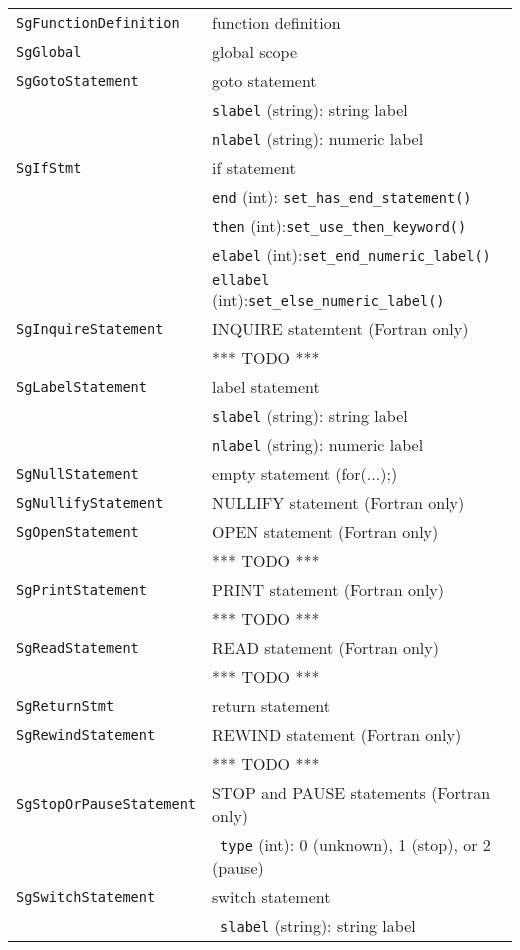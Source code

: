 \begin{longtable}[l]{l|p{10cm}}
 \texttt{SgFunctionDefinition}& function definition\\
 \texttt{SgGlobal}& global scope\\
 \texttt{SgGotoStatement}& goto statement\\
 & \texttt{slabel} (string): string label\\
 & \texttt{nlabel} (string): numeric label\\
 \texttt{SgIfStmt}& if statement\\
 & \texttt{end} (int): \texttt{set\_has\_end\_statement()}\\
 & \texttt{then} (int):\texttt{set\_use\_then\_keyword()}\\
 & \texttt{elabel} (int):\texttt{set\_end\_numeric\_label()}\\
 & \texttt{ellabel} (int):\texttt{set\_else\_numeric\_label()}\\
 \texttt{SgInquireStatement}& INQUIRE statemtent (Fortran only)\\
 & *** TODO *** \\
 \texttt{SgLabelStatement}& label statement\\
 & \texttt{slabel} (string): string label\\
 & \texttt{nlabel} (string): numeric label\\
 \texttt{SgNullStatement}& empty statement (for(...){;})\\
 \texttt{SgNullifyStatement}& NULLIFY statement (Fortran only)\\
 \texttt{SgOpenStatement}& OPEN statement (Fortran only)\\
 & *** TODO *** \\
 \texttt{SgPrintStatement}& PRINT statement (Fortran only)\\
 & *** TODO *** \\
 \texttt{SgReadStatement}& READ statement (Fortran only)\\
 & *** TODO *** \\
 \texttt{SgReturnStmt}& return statement\\
 \texttt{SgRewindStatement}& REWIND statement (Fortran only)\\
 & *** TODO *** \\
 \texttt{SgStopOrPauseStatement}& STOP and PAUSE statements (Fortran only)\\
 & ~\texttt{type} (int): 0 (unknown), 1 (stop), or 2 (pause)\\
 \texttt{SgSwitchStatement}& switch statement\\
 & ~\texttt{slabel} (string): string label\\

\end{longtable}
